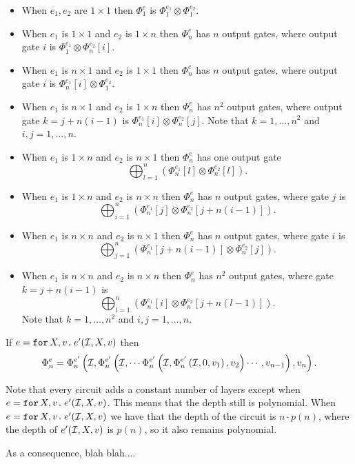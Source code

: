 \begin{itemize}
	\item When $e_1,e_2$ are $1\times 1$ then $\Phi^e_1$ is $\Phi^{e_1}_1 \otimes \Phi^{e_2}_1$.
	\item When $e_1$ is $1\times 1$ and $e_2$ is $1\times n$ then $\Phi^e_n$ has $n$ output gates, where output gate $i$ is $\Phi^{e_1}_1 \otimes \Phi^{e_2}_n[i]$.
	\item When $e_1$ is $n\times 1$ and $e_2$ is $1\times 1$ then $\Phi^e_n$ has $n$ output gates, where output gate $i$ is $\Phi^{e_1}_n[i] \otimes \Phi^{e_2}_1$.
	\item When $e_1$ is $n\times 1$ and $e_2$ is $1\times n$ then $\Phi^e_n$ has $n^2$ output gates, where output gate $k=j + n(i-1)$ is $\Phi^{e_1}_n[i] \otimes \Phi^{e_2}_n[j]$. Note that $k=1,\ldots, n^2$ and $i,j=1,\ldots, n$.
	\item When $e_1$ is $1\times n$ and $e_2$ is $n\times 1$ then $\Phi^e_n$ has one output gate $$\bigoplus_{l=1}^n \left( \Phi^{e_1}_n[l] \otimes \Phi^{e_2}_n[l] \right).$$
	\item When $e_1$ is $1\times n$ and $e_2$ is $n\times n$ then $\Phi^e_n$ has $n$ output gates, where gate $j$ is $$\bigoplus_{i=1}^n \left( \Phi^{e_1}_n[j] \otimes \Phi^{e_2}_n[j + n(i-1)] \right).$$
	\item When $e_1$ is $n\times n$ and $e_2$ is $n\times 1$ then $\Phi^e_n$ has $n$ output gates, where gate $i$ is $$\bigoplus_{j=1}^n \left( \Phi^{e_1}_n[j+n(i-1)] \otimes \Phi^{e_2}_n[j] \right).$$
	\item When $e_1$ is $n\times n$ and $e_2$ is $n\times n$ then $\Phi^e_n$ has $n^2$ output gates, where gate $k=j+n(i-1)$ is $$\bigoplus_{l=1}^n \left( \Phi^{e_1}_n[i] \otimes \Phi^{e_2}_n[j+n(l-1)] \right).$$ Note that $k=1,\ldots, n^2$ and $i,j=1,\ldots, n$.
\end{itemize}

If $e=\texttt{for}\, X,v \texttt{.}\, e'(\mathcal{I}, X, v)$ then $$\Phi^{e}_n=\Phi^{e'}_n\left( \mathcal{I}, \Phi^{e'}_n \left( \mathcal{I}, \cdots \Phi^{e'}_n\left( \mathcal{I}, \Phi^{e'}_n\left( \mathcal{I}, 0, v_1\right), v_2\right)\cdots, v_{n-1} \right), v_n \right).$$

Note that every circuit adds a constant number of layers except when $e=\texttt{for}\, X,v \texttt{.}\, e'(\mathcal{I}, X, v)$. This means that the depth still is polynomial. When $e=\texttt{for}\, X,v \texttt{.}\, e'(\mathcal{I}, X, v)$ we have that the depth of the circuit is $n\cdot p(n)$, where the depth of $e'(\mathcal{I}, X, v)$ is $p(n)$, so it also remains polynomial.

As a consequence, blah blah....

